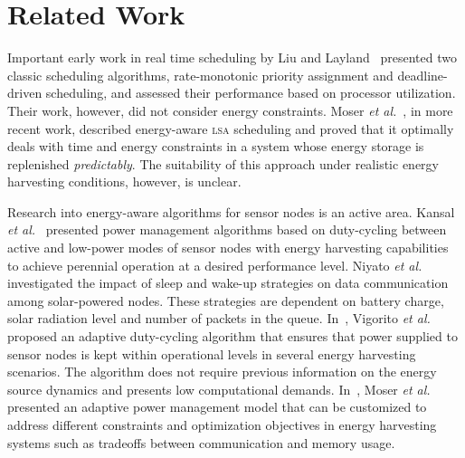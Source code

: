 \section{Related Work} \label{sec:related work}

Important early work in real time scheduling by Liu and Layland~\cite{Liu73} presented two classic scheduling algorithms,
rate-monotonic priority assignment and deadline-driven scheduling, and assessed their performance based on processor
utilization. Their work, however, did not consider energy constraints. 
Moser \emph{et al.}~\cite{moser2007real}, in more recent work, described energy-aware \textsc{lsa} scheduling
and proved that it optimally deals with time and energy constraints in a system whose energy storage is replenished
\textit{predictably}. The suitability of this approach under realistic energy harvesting conditions, however, is unclear. 

Research into energy-aware algorithms for sensor nodes is an active area. Kansal \emph{et al.}~\cite{kansal2007power}
presented power management algorithms based on duty-cycling between active and low-power modes of sensor nodes 
with energy harvesting capabilities to achieve perennial operation at a desired performance level. 
Niyato \emph{et al.}~\cite{niyato2007sleep} investigated the impact of sleep and wake-up strategies 
on data communication among solar-powered nodes. These strategies are dependent on battery charge, solar radiation
level and number of packets in the queue. In~\cite{vigorito2007adaptive}, Vigorito \emph{et al.} proposed an adaptive
duty-cycling algorithm that ensures that power supplied to sensor nodes is kept within operational levels in several
energy harvesting scenarios. The
algorithm does not require previous information on the energy source dynamics and presents low computational
demands. In~\cite{moser2007adaptive}, Moser \emph{et al.} presented an adaptive power management
model that can be customized to address different constraints and optimization objectives in energy harvesting systems 
such as tradeoffs between communication and memory usage.


